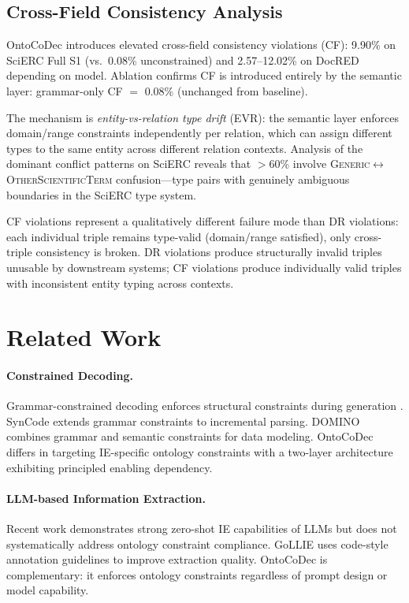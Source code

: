 \documentclass[11pt,a4paper]{article}
\newcommand{\sys}{OntoCoDec}
\begin{document}
\subsection{Cross-Field Consistency Analysis}
\label{sec:cf-analysis}

\sys{} introduces elevated cross-field consistency violations (CF): 9.90\% on SciERC Full S1 (vs.\ 0.08\% unconstrained) and 2.57--12.02\% on DocRED depending on model.
Ablation confirms CF is introduced entirely by the semantic layer: grammar-only CF $=$ 0.08\% (unchanged from baseline).

The mechanism is \emph{entity-vs-relation type drift} (EVR): the semantic layer enforces domain/range constraints independently per relation, which can assign different types to the same entity across different relation contexts.
Analysis of the dominant conflict patterns on SciERC reveals that $>$60\% involve \textsc{Generic}$\leftrightarrow$\textsc{OtherScientificTerm} confusion---type pairs with genuinely ambiguous boundaries in the SciERC type system.

CF violations represent a qualitatively different failure mode than DR violations: each individual triple remains type-valid (domain/range satisfied), only cross-triple consistency is broken.
DR violations produce structurally invalid triples unusable by downstream systems; CF violations produce individually valid triples with inconsistent entity typing across contexts.

\section{Related Work}
\label{sec:related}

\paragraph{Constrained Decoding.}
Grammar-constrained decoding enforces structural constraints during generation \cite{Willard2023Outlines,Dong2024XGrammar}.
SynCode \cite{Ugare2024SynCode} extends grammar constraints to incremental parsing.
DOMINO \cite{Beurer2024DOMINO} combines grammar and semantic constraints for data modeling.
\sys{} differs in targeting IE-specific ontology constraints with a two-layer architecture exhibiting principled enabling dependency.

\paragraph{LLM-based Information Extraction.}
Recent work demonstrates strong zero-shot IE capabilities of LLMs \cite{Wei2023ZeroShotIE,Wadhwa2023Revisiting,Li2023EvaluatingChatGPT} but does not systematically address ontology constraint compliance.
GoLLIE \cite{Sainz2024GoLLIE} uses code-style annotation guidelines to improve extraction quality.
\sys{} is complementary: it enforces ontology constraints regardless of prompt design or model capability.
\end{document}
